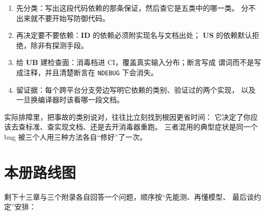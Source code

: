 \documentclass[12pt,a4paper,fontset=fandol]{ctexbook}
\newcommand{\Tp}[1]{\texttt{#1}}
\newcommand{\UB}{\textbf{\textsf{UB}}}
\newcommand{\IDB}{\textbf{\textsf{ID}}}
\newcommand{\USB}{\textbf{\textsf{US}}}
\begin{document}
\begin{bestpractice}[title={按类别选择处理手段的四步法}]
\begin{enumerate}
  \item 先分类：写出这段代码依赖的那条保证，然后查它是五类中的哪一类。
        分不出来就不要开始写防御代码。
  \item 再决定要不要依赖：\IDB{} 的依赖必须附实现名与文档出处；
        \USB{} 的依赖默认拒绝，除非有探测手段。
  \item 给 \UB{} 建检查面：消毒档进 CI，覆盖真实输入分布；断言写成
        谓词而不是写成注释，并且清楚断言在 \Tp{NDEBUG} 下会消失。
  \item 留证据：每个跨平台分支旁边写明它依赖的类别、验证过的两个实现，
        以及一旦换编译器时该看哪一段文档。
\end{enumerate}
\end{bestpractice}

\begin{note}[title={分类的边际收益}]
实际排障里，把事故的类别说对，往往比立刻找到根因更省时间：
它决定了你应该去查标准、查实现文档、还是去开消毒器重跑。
三者混用的典型症状是同一个 bug 被三个人用三种方法各自“修好”了一次。
\end{note}

\section{本册路线图}\label{sec:ub01-roadmap}

剩下十三章与三个附录各自回答一个问题，顺序按“先能测、再懂模型、
最后谈约定”安排：
\end{document}
